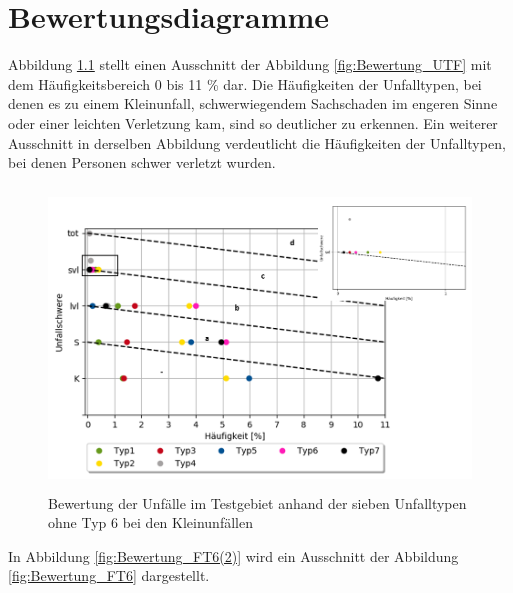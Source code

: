 
\chapter{Bewertungsdiagramme}\label{chapter:Bewertungsdiagramme}
Abbildung \ref{fig:Bewertung_UTF(2)} stellt einen Ausschnitt der Abbildung \ref{fig:Bewertung_UTF} mit dem Häufigkeitsbereich 0 bis 11 \% dar. Die Häufigkeiten der Unfalltypen, bei denen es zu einem Kleinunfall, schwerwiegendem Sachschaden im engeren Sinne oder einer leichten Verletzung kam, sind so deutlicher zu erkennen. Ein weiterer Ausschnitt in derselben Abbildung verdeutlicht die Häufigkeiten der Unfalltypen, bei denen Personen schwer verletzt wurden.

\begin{savenotes}
	\begin{figure}[H]
		\centering
		\includegraphics[width=12cm,height=8cm]{figures/Bewertung_UTF(2)}
		\caption[Bewertung der Unfälle im Testgebiet anhand der sieben Unfalltypen ohne Typ 6 bei den Kleinunfällen]{Bewertung der Unfälle im Testgebiet anhand der sieben Unfalltypen ohne Typ 6 bei den Kleinunfällen}\label{fig:Bewertung_UTF(2)}
	\end{figure}
\end{savenotes}

In Abbildung \ref{fig:Bewertung_FT6(2)} wird ein Ausschnitt der Abbildung \ref{fig:Bewertung_FT6} dargestellt.

